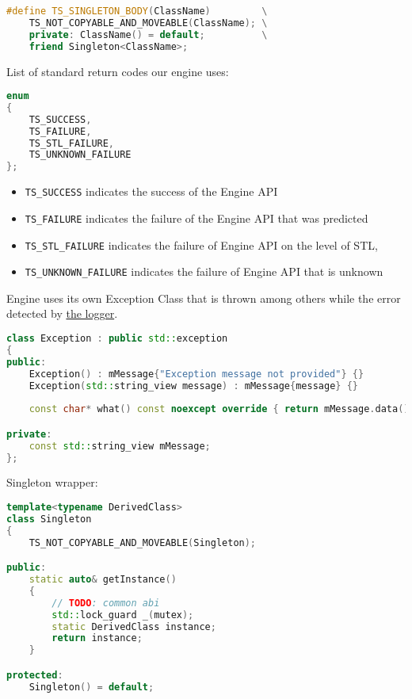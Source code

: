 \begin{itemize}
\begin{itemize}
\begin{lstlisting}[language=c++, caption=Macros of Public Engine Utils(./engine/include/tsengine/utils.hpp)]
#define TS_SINGLETON_BODY(ClassName)         \
    TS_NOT_COPYABLE_AND_MOVEABLE(ClassName); \
    private: ClassName() = default;          \
    friend Singleton<ClassName>;
\end{lstlisting}
\label{sec:return_codes}
List of standard return codes our engine uses:
\begin{lstlisting}[language=c++, caption=Return Codes of Public Engine Utils(./engine/include/tsengine/utils.hpp)]
enum
{
    TS_SUCCESS,
    TS_FAILURE,
    TS_STL_FAILURE,
    TS_UNKNOWN_FAILURE
};
\end{lstlisting}
\begin{itemize}
    \item \texttt{TS\_SUCCESS} indicates the success of the Engine API
    \item \texttt{TS\_FAILURE} indicates the failure of the Engine API that was predicted
    \item \texttt{TS\_STL\_FAILURE} indicates the failure of Engine API on the level of STL,
    \item \texttt{TS\_UNKNOWN\_FAILURE} indicates the failure of Engine API that is unknown
\end{itemize}
Engine uses its own Exception Class that is thrown among others while the error detected by \hyperref[sec:logger]{the logger}.
\begin{lstlisting}[language=c++, caption=Exception of Public Engine Utils(./engine/include/tsengine/utils.hpp)]
class Exception : public std::exception
{
public:
    Exception() : mMessage{"Exception message not provided"} {}
    Exception(std::string_view message) : mMessage{message} {}
    
    const char* what() const noexcept override { return mMessage.data(); }

private:
    const std::string_view mMessage;
};
\end{lstlisting}
Singleton wrapper:
\begin{lstlisting}[language=c++, caption=Singleton of Public Engine Utils(./engine/include/tsengine/utils.hpp)]
template<typename DerivedClass>
class Singleton
{
    TS_NOT_COPYABLE_AND_MOVEABLE(Singleton);

public:
    static auto& getInstance()
    {
        // TODO: common abi
        std::lock_guard _(mutex);
        static DerivedClass instance;
        return instance;
    }

protected:
    Singleton() = default;


\end{lstlisting}
\end{itemize}
\end{itemize}
